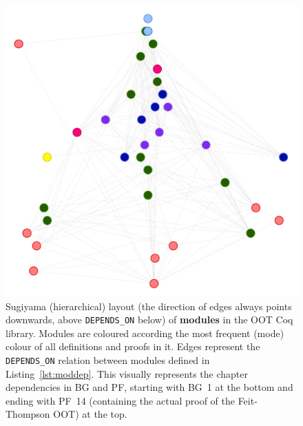 \begin{figure}[tp]
\centering
\includegraphics[height=0.35\textheight]{img/oot/module_hierarchical}
\caption{Sugiyama (hierarchical) layout (the direction of edges always
  points downwards, above \texttt{DEPENDS\_ON} below) of \textbf{modules} in the
  OOT Coq library. Modules are coloured according the most frequent (mode)
  colour of all definitions and proofs in it. Edges represent the
  \texttt{DEPENDS\_ON} relation between modules defined in
  Listing~\ref{lst:moddep}. This visually represents the chapter dependencies in
  BG and PF, starting with BG~1 at the bottom and ending with PF~14 (containing
  the actual proof of the Feit-Thompson OOT) at the top.}\label{fig:oot:modhier}
\end{figure}


